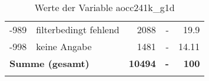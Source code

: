\begin{longtable}{Xlrrr}
       -989 & filterbedingt fehlend & \num{2088} & - & \num[round-mode=places,round-precision=2]{19.9} \\

       -998 & keine Angabe & \num{1481} & - & \num[round-mode=places,round-precision=2]{14.11} \\

     \midrule
     \multicolumn{2}{l}{\textbf{Summe (gesamt)}} & \textbf{\num{10494}} & \textbf{-} & \textbf{\num{100}} \\
     \bottomrule
     \caption{Werte der Variable aocc241k\_g1d}
     \end{longtable}
     
